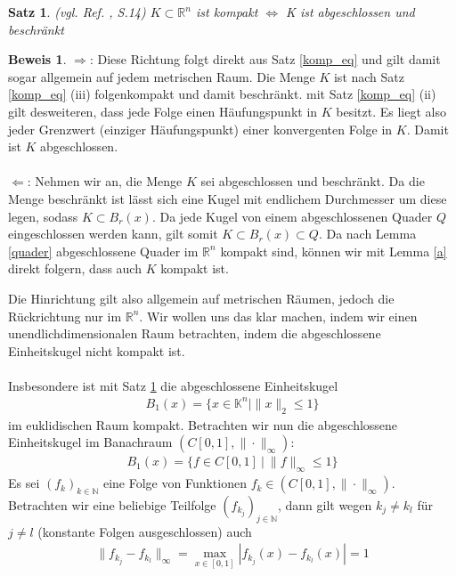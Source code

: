 \documentclass[10pt,a4paper]{article}
\theoremstyle{plain}
\newtheorem{satz}{Satz}[section]
\newenvironment{sa}{\begin{shaded}\begin{satz}}{\end{satz}\end{shaded}}
\theoremstyle{definition}
\theoremstyle{nonumberplain}
\newtheorem{beweis}{Beweis}
\newenvironment{bew}{\begin{beweis}}{\end{beweis}}
\newcommand{\N}{\mathbb{N}}
\newcommand{\R}{\mathbb{R}}
\newcommand{\K}{\mathbb{K}}
\begin{document}
\begin{sa}
\label{heine-borel}
(vgl. Ref. \cite{Clason}, S.14) $K \subset \R^n$ ist \textit{kompakt} $\Leftrightarrow$ K ist abgeschlossen und beschränkt
\end{sa}
\begin{bew}
$\Rightarrow$: Diese Richtung folgt direkt aus Satz \hyperref[komp_eq]{\ref*{komp_eq}} und gilt damit sogar allgemein auf jedem metrischen Raum. Die Menge $K$ ist nach Satz \hyperref[komp_eq]{\ref*{komp_eq}} (iii) folgenkompakt und damit beschränkt. mit Satz \hyperref[komp_eq]{\ref*{komp_eq}} (ii) gilt desweiteren, dass jede Folge einen Häufungspunkt in $K$ besitzt. Es liegt also jeder Grenzwert (einziger Häufungspunkt) einer konvergenten Folge in $K$. Damit ist $K$ abgeschlossen.\\\\
$\Leftarrow$: Nehmen wir an, die Menge $K$ sei abgeschlossen und beschränkt. Da die Menge beschränkt ist lässt sich eine Kugel mit endlichem Durchmesser um diese legen, sodass $K \subset B_r(x)$. Da jede Kugel von einem abgeschlossenen Quader $Q$ eingeschlossen werden kann, gilt somit $K \subset B_r(x) \subset Q$. Da nach Lemma \hyperref[quader]{\ref*{quader}} abgeschlossene Quader im $\R^n$ kompakt sind, können wir mit Lemma \hyperref[a]{\ref*{a}} direkt folgern, dass auch $K$ kompakt ist.
\end{bew}
Die Hinrichtung gilt also allgemein auf metrischen Räumen, jedoch die Rückrichtung nur im $\R^n$. Wir wollen uns das klar machen, indem wir einen unendlichdimensionalen Raum betrachten, indem die abgeschlossene Einheitskugel nicht kompakt ist.\\\\
Insbesondere ist mit Satz \hyperref[heine-borel]{\ref*{heine-borel}} die abgeschlossene Einheitskugel
\begin{align*}
B_1(x) = \{x \in \K^n | \|x\|_2 \leq 1\}
\end{align*}
 im euklidischen Raum kompakt.
Betrachten wir nun die abgeschlossene Einheitskugel im Banachraum $(C[0,1], \|\cdot\|_\infty)$:
\begin{align*}
B_1(x) = \{f \in C[0,1] \: | \: \|f\|_\infty \leq 1\}
\end{align*}
Es sei ${(f_k)}_{k \in \N}$ eine Folge von Funktionen $f_k \in (C[0,1], \|\cdot\|_\infty)$. Betrachten wir eine beliebige Teilfolge ${(f_{k_j})}_{j \in \N}$, dann gilt wegen $k_j \neq k_l$ für $j \neq l$ (konstante Folgen ausgeschlossen) auch
\begin{align*}
\|f_{k_j} - f_{k_l}\|_\infty = \max_{x \in [0,1]}{|f_{k_j}(x) - f_{k_l}(x)|} = 1
\end{align*}
\end{document}
